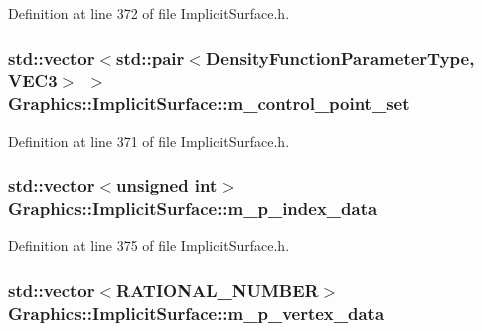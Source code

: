 Definition at line 372 of file ImplicitSurface.h.

\hypertarget{class_graphics_1_1_implicit_surface_a095239fc5e7e142a54dd647af02f5bd3}{
\subsubsection[{m\_\-control\_\-point\_\-set}]{\setlength{\rightskip}{0pt plus 5cm}std::vector$<$std::pair$<${\bf DensityFunctionParameterType}, {\bf VEC3}$>$ $>$ {\bf Graphics::ImplicitSurface::m\_\-control\_\-point\_\-set}}}
\label{class_graphics_1_1_implicit_surface_a095239fc5e7e142a54dd647af02f5bd3}


Definition at line 371 of file ImplicitSurface.h.

\hypertarget{class_graphics_1_1_implicit_surface_ad1710ec993307578fbf7a1aa9c4fc9ae}{
\subsubsection[{m\_\-p\_\-index\_\-data}]{\setlength{\rightskip}{0pt plus 5cm}std::vector$<$unsigned int$>$ {\bf Graphics::ImplicitSurface::m\_\-p\_\-index\_\-data}}}
\label{class_graphics_1_1_implicit_surface_ad1710ec993307578fbf7a1aa9c4fc9ae}


Definition at line 375 of file ImplicitSurface.h.

\hypertarget{class_graphics_1_1_implicit_surface_a765fc907fac987217a58b070e82c9003}{
\subsubsection[{m\_\-p\_\-vertex\_\-data}]{\setlength{\rightskip}{0pt plus 5cm}std::vector$<${\bf RATIONAL\_\-NUMBER}$>$ {\bf Graphics::ImplicitSurface::m\_\-p\_\-vertex\_\-data}}}
\label{class_graphics_1_1_implicit_surface_a765fc907fac987217a58b070e82c9003}


